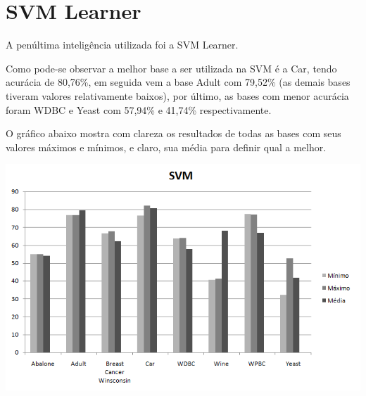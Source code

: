 \section{SVM Learner}
\label{sec:arvore}

A penúltima inteligência utilizada foi a SVM Learner.

Como pode-se observar a melhor base a ser utilizada na SVM é a Car, tendo acurácia de 80,76\%, em seguida vem a base Adult com 79,52\% (as demais bases tiveram valores relativamente baixos), por último, as bases com menor acurácia foram WDBC e Yeast com 57,94\% e 41,74\% respectivamente.

O gráfico abaixo mostra com clareza os resultados de todas as bases com seus valores máximos e mínimos, e claro, sua média para definir qual a melhor.

\begin{center}
      \includegraphics[scale=1.0]{imagens/svm.png}
\end{center}